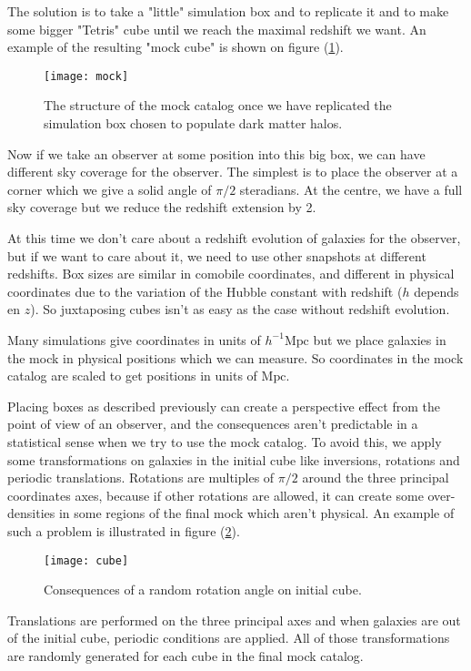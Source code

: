 The solution is to take a "little" simulation box and to replicate it and to make some bigger "Tetris" cube until we reach the
maximal redshift we want. An example of the resulting "mock cube" is shown on figure (\ref{fig:cubemock}).
\begin{figure}[ht]
	\centering
	\texttt{[image: mock]}
	\caption{\footnotesize{}The structure of the mock catalog once we have replicated the simulation box chosen to populate dark
	matter halos.}
	\label{fig:cubemock}
\end{figure}

Now if we take an observer at some position into this big box, we can have different sky coverage for the observer. The simplest is
to place the observer at a corner which we give a solid angle of $\pi/2$ steradians. At the centre, we have a full sky coverage but
we reduce the redshift extension by 2.

At this time we don't care about a redshift evolution of galaxies for the observer, but if we want to care about it, we need to use
other snapshots at different redshifts. Box sizes are similar in comobile coordinates, and different in physical coordinates
due to the variation of the Hubble constant with redshift ($h$ depends en $z$). So juxtaposing cubes isn't as easy as the case
without redshift evolution.

Many simulations give coordinates in units of $h^{-1}\mathrm{Mpc}$ but we place galaxies in the mock in physical positions which we
can measure. So coordinates in the mock catalog are scaled to get positions in units of $\mathrm{Mpc}$.

Placing boxes as described previously can create a perspective effect from the point of view of an observer, and the consequences
aren't predictable in a statistical sense when we try to use the mock catalog. To avoid this, we apply some transformations on
galaxies in the initial cube like inversions, rotations and periodic translations. Rotations are multiples of $\pi/2$ around the
three principal coordinates axes, because if other rotations are allowed, it can create some over-densities in some regions of the
final mock which aren't physical. An example of such a problem is illustrated in figure (\ref{fig:rotation}).
\begin{figure}[ht]
	\centering
	\texttt{[image: cube]}
	\caption{\footnotesize{}Consequences of a random rotation angle on initial cube.}
	\label{fig:rotation}
\end{figure}
Translations are performed on the three principal axes and when galaxies are out of the initial cube, periodic conditions are
applied. All of those transformations are randomly generated for each cube in the final mock catalog.

